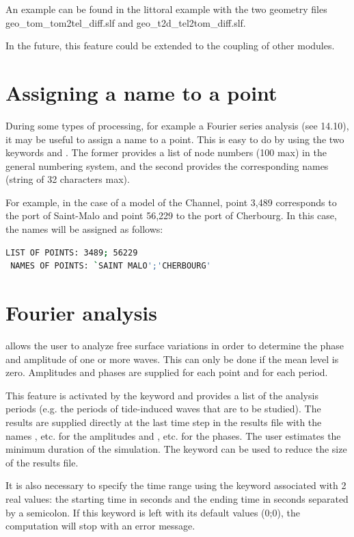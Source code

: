 An example can be found in the littoral \sisyphe example with the two
geometry files geo\_tom\_tom2tel\_diff.slf and
geo\_t2d\_tel2tom\_diff.slf.

In the future, this feature could be extended to the coupling of other modules.


\section{Assigning a name to a point}

During some types of processing, for example a Fourier series analysis
(see 14.10),
it may be useful to assign a name to a point.
This is easy to do by using the two keywords 
and .
The former provides a list of node numbers (100 max) in the general numbering
system,
and the second provides the corresponding names (string of 32 characters max).

For example, in the case of a model of the Channel, point 3,489 corresponds
to the port of Saint-Malo and point 56,229 to the port of Cherbourg.
In this case, the names will be assigned as follows:
\begin{lstlisting}[language=bash]
 LIST OF POINTS: 3489; 56229
 NAMES OF POINTS: `SAINT MALO';'CHERBOURG'
\end{lstlisting}

\section{Fourier analysis}

 allows the user to analyze free surface variations
in order to determine the phase and amplitude of one or more waves.
This can only be done if the mean level is zero.
Amplitudes and phases are supplied for each point and for each period.

This feature is activated by the keyword  and
provides a list of the analysis periods (e.g. the periods of tide-induced waves
that are to be studied).
The results are supplied directly at the last time step in the results file with
the names ,  etc. for the amplitudes
and ,  etc. for the phases.
The user estimates the minimum duration of the simulation.
The keyword 
can be used to reduce the size of the results file.

It is also necessary to specify the time range using the keyword
 associated with 2 real values:
the starting time in seconds and the ending time in seconds separated by a
semicolon.
If this keyword is left with its default values (0;0),
the computation will stop with an error message.

